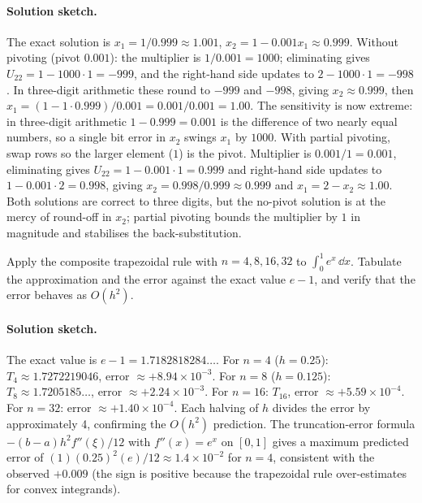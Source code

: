 \paragraph{Solution sketch.}
The exact solution is $x_{1} = 1/0.999 \approx 1.001$, $x_{2} =
1 - 0.001 x_{1} \approx 0.999$. Without pivoting (pivot $0.001$):
the multiplier is $1/0.001 = 1000$; eliminating gives $U_{22} =
1 - 1000 \cdot 1 = -999$, and the right-hand side updates to
$2 - 1000 \cdot 1 = -998$. In three-digit arithmetic these round
to $-999$ and $-998$, giving $x_{2} \approx 0.999$, then
$x_{1} = (1 - 1 \cdot 0.999) / 0.001 = 0.001 / 0.001 = 1.00$. The
sensitivity is now extreme: in three-digit arithmetic
$1 - 0.999 = 0.001$ is the difference of two nearly equal numbers,
so a single bit error in $x_{2}$ swings $x_{1}$ by $1000$. With
partial pivoting, swap rows so the larger element ($1$) is the
pivot. Multiplier is $0.001/1 = 0.001$, eliminating gives
$U_{22} = 1 - 0.001 \cdot 1 = 0.999$ and right-hand side updates
to $1 - 0.001 \cdot 2 = 0.998$, giving $x_{2} = 0.998/0.999 \approx
0.999$ and $x_{1} = 2 - x_{2} \approx 1.00$. Both solutions are
correct to three digits, but the no-pivot solution is at the mercy
of round-off in $x_{2}$; partial pivoting bounds the multiplier by
$1$ in magnitude and stabilises the back-substitution.

\begin{exercise}
Apply the composite trapezoidal rule with $n = 4, 8, 16, 32$ to
$\int_{0}^{1} e^{x}\, \dd x$. Tabulate the approximation and the
error against the exact value $e - 1$, and verify that the error
behaves as $O(h^{2})$.
\end{exercise}

\paragraph{Solution sketch.}
The exact value is $e - 1 = 1.7182818284\ldots$.
For $n = 4$ ($h = 0.25$): $T_{4} \approx 1.7272219046$, error
$\approx +8.94 \times 10^{-3}$. For $n = 8$ ($h = 0.125$):
$T_{8} \approx 1.7205185\ldots$, error $\approx +2.24 \times
10^{-3}$. For $n = 16$: $T_{16}$, error $\approx +5.59 \times 10^{-4}$.
For $n = 32$: error $\approx +1.40 \times 10^{-4}$. Each halving of
$h$ divides the error by approximately 4, confirming the $O(h^{2})$
prediction. The truncation-error formula
$-(b - a) h^{2} f''(\xi) / 12$ with $f''(x) = e^{x}$ on $[0, 1]$
gives a maximum predicted error of $(1)(0.25)^{2}(e)/12
\approx 1.4 \times 10^{-2}$ for $n = 4$, consistent with the
observed $+0.009$ (the sign is positive because the trapezoidal
rule over-estimates for convex integrands).

